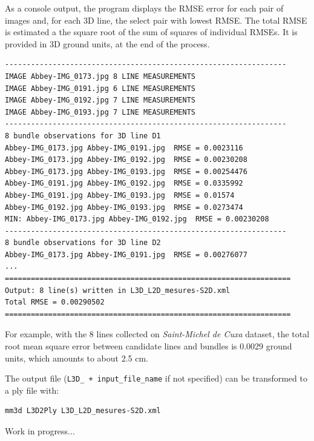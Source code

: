 \noindent As a console output, the program displays the RMSE error for each pair of images and, for each 3D line, the select pair with lowest RMSE. The total RMSE is estimated a the square root of the sum of squares of individual RMSEs. It is provided in 3D ground units, at the end of the process. \newline

\begin{verbatim}
-----------------------------------------------------------------
IMAGE Abbey-IMG_0173.jpg 8 LINE MEASUREMENTS
IMAGE Abbey-IMG_0191.jpg 6 LINE MEASUREMENTS
IMAGE Abbey-IMG_0192.jpg 7 LINE MEASUREMENTS
IMAGE Abbey-IMG_0193.jpg 7 LINE MEASUREMENTS
-----------------------------------------------------------------
8 bundle observations for 3D line D1
Abbey-IMG_0173.jpg Abbey-IMG_0191.jpg  RMSE = 0.0023116
Abbey-IMG_0173.jpg Abbey-IMG_0192.jpg  RMSE = 0.00230208
Abbey-IMG_0173.jpg Abbey-IMG_0193.jpg  RMSE = 0.00254476
Abbey-IMG_0191.jpg Abbey-IMG_0192.jpg  RMSE = 0.0335992
Abbey-IMG_0191.jpg Abbey-IMG_0193.jpg  RMSE = 0.01574
Abbey-IMG_0192.jpg Abbey-IMG_0193.jpg  RMSE = 0.0273474
MIN: Abbey-IMG_0173.jpg Abbey-IMG_0192.jpg  RMSE = 0.00230208
-----------------------------------------------------------------
8 bundle observations for 3D line D2
Abbey-IMG_0173.jpg Abbey-IMG_0191.jpg  RMSE = 0.00276077
...
==================================================================
Output: 8 line(s) written in L3D_L2D_mesures-S2D.xml
Total RMSE = 0.00290502
==================================================================
\end{verbatim}
\vspace{0.3cm}

\noindent For example, with the 8 lines collected on \textit{Saint-Michel de Cuxa} dataset, the total root mean square error between candidate lines and bundles is 0.0029 ground units, which amounts to about 2.5 cm. \newline 


\noindent The output file (\texttt{L3D\_ + input\_file\_name} if not specified) can be transformed to a ply file with:

\begin{verbatim}
mm3d L3D2Ply L3D_L2D_mesures-S2D.xml
\end{verbatim}
\vspace{1cm}


\noindent Work in progress...


